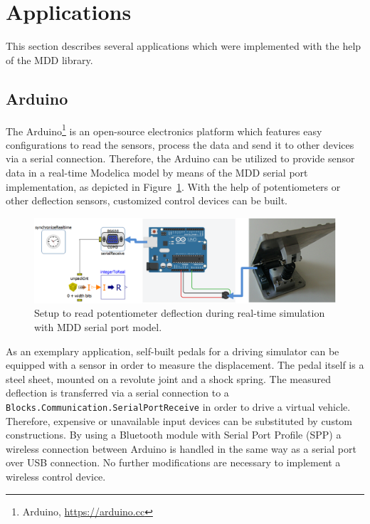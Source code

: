 \documentclass{resources/modelica}
\newcommand{\modelica}[1]{\lstinline[language=modelica]|#1|}
\begin{document}
\section{Applications}
\label{sec:Applications}

This section describes several applications which were implemented with the
help of the MDD library.

\subsection{Arduino}

The Arduino\footnote{Arduino, \url{https://arduino.cc}} is an open-source electronics platform which features easy configurations to read the sensors, process the data and send it to other devices via a serial connection.
Therefore, the Arduino can be utilized to provide sensor data in a real-time Modelica model by means of the MDD serial port implementation, as depicted in Figure~\ref{fig:arduino}.
With the help of potentiometers or other deflection sensors, customized control devices can be built.
\begin{figure}[h]
  \centering
  \includegraphics[width=0.9\columnwidth]{figures/arduino}
  \caption{Setup to read potentiometer deflection during real-time simulation with MDD serial port model\protect\footnotemark.}
  \label{fig:arduino}
\end{figure}

\noindent
As an exemplary application, self-built pedals for a driving simulator can be equipped with a sensor in order to measure the displacement. The pedal itself is a steel sheet, mounted on a revolute joint and a shock spring.
The measured deflection is transferred via a serial connection to a \modelica{Blocks.Communication.SerialPortReceive} in order to drive a virtual vehicle.
Therefore, expensive or unavailable input devices can be substituted by custom constructions.
By using a Bluetooth module with Serial Port Profile (SPP) a wireless connection between Arduino is handled in the same way as a serial port over USB connection.
No further modifications are necessary to implement a wireless control device.
\end{document}
